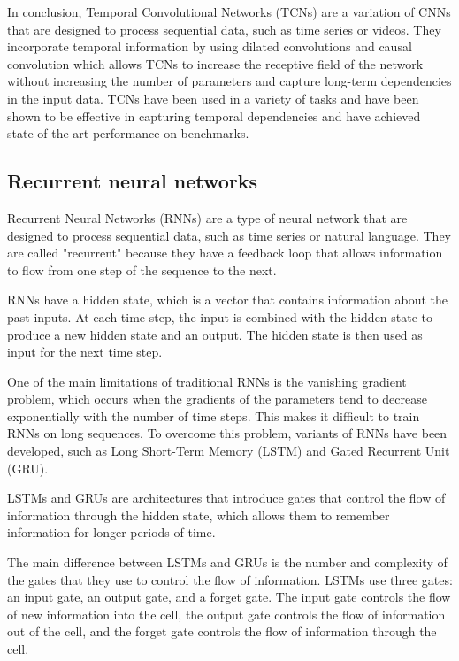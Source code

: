 In conclusion, Temporal Convolutional Networks (TCNs) are a variation of CNNs that are designed to process sequential data, such as time series or videos.
They incorporate temporal information by using dilated convolutions and causal convolution which allows TCNs to increase the receptive field of the network without increasing the number of parameters and capture long-term dependencies in the input data.
TCNs have been used in a variety of tasks and have been shown to be effective in capturing temporal dependencies and have achieved state-of-the-art performance on benchmarks.


\subsection{Recurrent neural networks}

Recurrent Neural Networks (RNNs) \cite{graves2013generating, goodfellow2016deep} are a type of neural network that are designed to process sequential data, such as time series or natural language.
They are called "recurrent" because they have a feedback loop that allows information to flow from one step of the sequence to the next.

RNNs have a hidden state, which is a vector that contains information about the past inputs.
At each time step, the input is combined with the hidden state to produce a new hidden state and an output.
The hidden state is then used as input for the next time step.

One of the main limitations of traditional RNNs is the vanishing gradient problem, which occurs when the gradients of the parameters tend to decrease exponentially with the number of time steps.
This makes it difficult to train RNNs on long sequences.
To overcome this problem, variants of RNNs have been developed, such as Long Short-Term Memory (LSTM) and Gated Recurrent Unit (GRU).

LSTMs and GRUs are architectures that introduce gates that control the flow of information through the hidden state, which allows them to remember information for longer periods of time. 

The main difference between LSTMs and GRUs is the number and complexity of the gates that they use to control the flow of information.
LSTMs use three gates: an input gate, an output gate, and a forget gate.
The input gate controls the flow of new information into the cell, the output gate controls the flow of information out of the cell, and the forget gate controls the flow of information through the cell.

